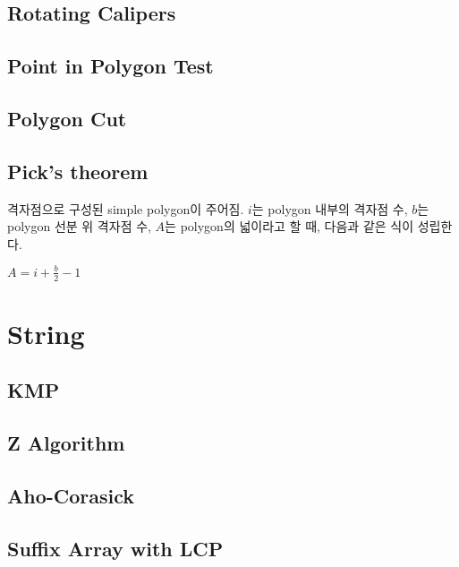 \documentclass[10pt,landscape,a4paper,twocolumn]{article}
\begin{document}
\subsection{Rotating Calipers}


\subsection{Point in Polygon Test}


\subsection{Polygon Cut}


\subsection{Pick's theorem}

격자점으로 구성된 simple polygon이 주어짐. $i$는 polygon 내부의 격자점 수, $b$는 polygon 선분 위 격자점 수, $A$는 polygon의 넓이라고 할 때, 다음과 같은 식이 성립한다.

$A = i + \frac{b}{2} - 1$

\section{String}

\subsection{KMP}


\subsection{Z Algorithm}


\subsection{Aho-Corasick}


\subsection{Suffix Array with LCP}

\end{document}
